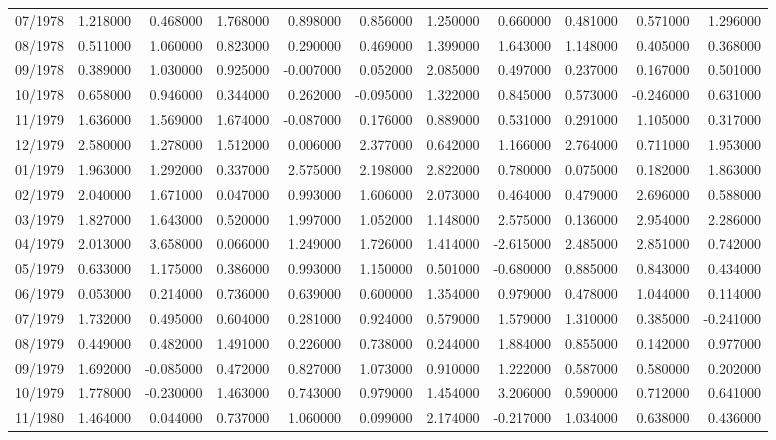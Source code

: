 \begin{tabular}{lrrrrrrrrrr}
07/1978 & 1.218000 & 0.468000 & 1.768000 & 0.898000 & 0.856000 & 1.250000 & 0.660000 & 0.481000 & 0.571000 & 1.296000 \\
08/1978 & 0.511000 & 1.060000 & 0.823000 & 0.290000 & 0.469000 & 1.399000 & 1.643000 & 1.148000 & 0.405000 & 0.368000 \\
09/1978 & 0.389000 & 1.030000 & 0.925000 & -0.007000 & 0.052000 & 2.085000 & 0.497000 & 0.237000 & 0.167000 & 0.501000 \\
10/1978 & 0.658000 & 0.946000 & 0.344000 & 0.262000 & -0.095000 & 1.322000 & 0.845000 & 0.573000 & -0.246000 & 0.631000 \\
11/1979 & 1.636000 & 1.569000 & 1.674000 & -0.087000 & 0.176000 & 0.889000 & 0.531000 & 0.291000 & 1.105000 & 0.317000 \\
12/1979 & 2.580000 & 1.278000 & 1.512000 & 0.006000 & 2.377000 & 0.642000 & 1.166000 & 2.764000 & 0.711000 & 1.953000 \\
01/1979 & 1.963000 & 1.292000 & 0.337000 & 2.575000 & 2.198000 & 2.822000 & 0.780000 & 0.075000 & 0.182000 & 1.863000 \\
02/1979 & 2.040000 & 1.671000 & 0.047000 & 0.993000 & 1.606000 & 2.073000 & 0.464000 & 0.479000 & 2.696000 & 0.588000 \\
03/1979 & 1.827000 & 1.643000 & 0.520000 & 1.997000 & 1.052000 & 1.148000 & 2.575000 & 0.136000 & 2.954000 & 2.286000 \\
04/1979 & 2.013000 & 3.658000 & 0.066000 & 1.249000 & 1.726000 & 1.414000 & -2.615000 & 2.485000 & 2.851000 & 0.742000 \\
05/1979 & 0.633000 & 1.175000 & 0.386000 & 0.993000 & 1.150000 & 0.501000 & -0.680000 & 0.885000 & 0.843000 & 0.434000 \\
06/1979 & 0.053000 & 0.214000 & 0.736000 & 0.639000 & 0.600000 & 1.354000 & 0.979000 & 0.478000 & 1.044000 & 0.114000 \\
07/1979 & 1.732000 & 0.495000 & 0.604000 & 0.281000 & 0.924000 & 0.579000 & 1.579000 & 1.310000 & 0.385000 & -0.241000 \\
08/1979 & 0.449000 & 0.482000 & 1.491000 & 0.226000 & 0.738000 & 0.244000 & 1.884000 & 0.855000 & 0.142000 & 0.977000 \\
09/1979 & 1.692000 & -0.085000 & 0.472000 & 0.827000 & 1.073000 & 0.910000 & 1.222000 & 0.587000 & 0.580000 & 0.202000 \\
10/1979 & 1.778000 & -0.230000 & 1.463000 & 0.743000 & 0.979000 & 1.454000 & 3.206000 & 0.590000 & 0.712000 & 0.641000 \\
11/1980 & 1.464000 & 0.044000 & 0.737000 & 1.060000 & 0.099000 & 2.174000 & -0.217000 & 1.034000 & 0.638000 & 0.436000 \\

\end{tabular}

